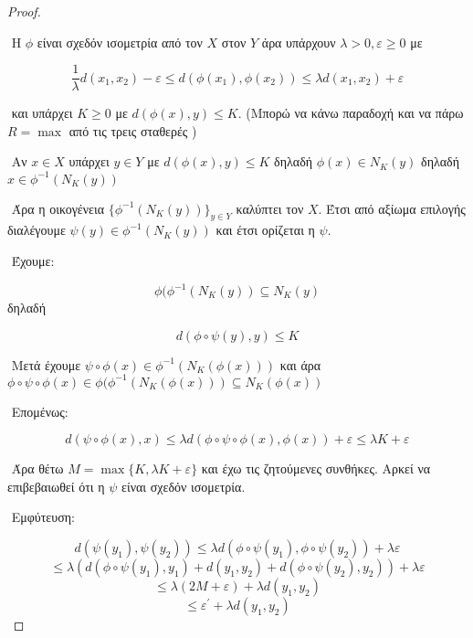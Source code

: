 \documentclass[oneside,a4paper]{article}
\begin{document}
\begin{proof} $ $

$ $\newline
Η $\phi$ είναι σχεδόν ισομετρία από τον $X$ στον $Y$ άρα υπάρχουν $\lambda >0, \varepsilon \geq 0$ με

$$\frac{1}{\lambda}d(x_1,x_2) -\varepsilon \leq d(\phi(x_1),\phi(x_2)) \leq \lambda d(x_1,x_2) + \varepsilon$$

$ $\newline
και υπάρχει $K\geq 0$ με $d(\phi(x),y) \leq K$. (Mπορώ να κάνω παραδοχή και να πάρω $R = \max$ από τις τρεις σταθερές )

$ $\newline
Αν $x \in X$ υπάρχει $y \in Y$ με $d(\phi(x),y) \leq K$ δηλαδή $\phi (x) \in N_K(y)$ δηλαδή $x \in \phi^{-1} (N_K(y))$

$ $\newline
Άρα η οικογένεια $\{\phi^{-1} (N_K(y))\}_{y \in Y}$ καλύπτει τον $X$. Έτσι από αξίωμα επιλογής διαλέγουμε $\psi (y) \in \phi^{-1} (N_K(y))$ και έτσι ορίζεται η $\psi$.

$ $\newline
Έχουμε:

$$\phi (\phi^{-1} (N_K(y)) \subseteq N_K(y)$$ δηλαδή 

$$d(\phi \circ \psi (y),y) \leq K$$

$ $\newline
Μετά έχουμε $\psi \circ \phi (x) \in \phi^{-1} (N_K(\phi (x)))$ και άρα $\phi \circ \psi \circ \phi(x) \in \phi (\phi^{-1} (N_K(\phi(x))) \subseteq N_K(\phi(x))$

$ $\newline
Επομένως:


$$d(\psi\circ \phi(x) , x) \leq \lambda d(\phi \circ \psi \circ \phi(x), \phi(x)) + \varepsilon \leq \lambda K + \varepsilon$$

$ $\newline
Άρα θέτω $M = \max \{K,\lambda K + \varepsilon\}$ και έχω τις ζητούμενες συνθήκες. Αρκεί να επιβεβαιωθεί ότι η $\psi$ είναι σχεδόν ισομετρία.

$ $\newline
Εμφύτευση:

$$d(\psi(y_1),\psi(y_2)) \leq \lambda d(\phi \circ \psi (y_1) , \phi \circ \psi (y_2)) + \lambda \varepsilon$$
$$\leq \lambda ( d(\phi\circ\psi(y_1),y_1) + d(y_1,y_2) + d(\phi\circ\psi(y_2),y_2)) + \lambda \varepsilon$$
$$\leq \lambda (2M+\varepsilon) + \lambda d(y_1,y_2)$$
$$\leq \varepsilon^{\prime} + \lambda d(y_1,y_2)$$


\end{proof}
\end{document}
